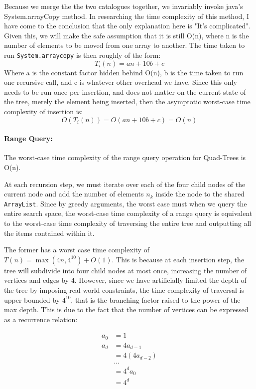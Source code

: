 \documentclass[12pt]{article}
\begin{document}
{Because we merge the the two catalogues together, we invariably invoke java's System.arrayCopy method. In researching the time complexity of this method, I have come to the conclusion that the only explanation here is "It's complicated". Given this, we will make the safe assumption that it is still O(n), where n is the number of elements to be moved from one array to another. \newline
The time taken to run \texttt{System.arraycopy} is then roughly of the form:
$$T_i(n) = an + 10b + c$$
Where a is the constant factor hidden behind O(n), b is the time taken to run one recursive call, and c is whatever other overhead we have. Since this only needs to be run once per insertion, and does not matter on the current state of the tree, merely the element being inserted, then the asymptotic worst-case time complexity of insertion is:
$$O(T_i(n)) = O(an + 10b + c) = O(n)$$



\paragraph{Range Query:} 
The worst-case time complexity of the range query operation for Quad-Trees is O(n).

At each recursion step, we must iterate over each of the four child nodes of the current node and add the number of elements $n_k$ inside the node to the shared \texttt{ArrayList}. Since by greedy arguments, the worst case must when we query the entire search space, the worst-case time complexity of a range query is equivalent to the worst-case time complexity of traversing the entire tree and outputting all the items contained within it. 

The former has a worst case time complexity of $T(n) = \max(4n, 4^{10}) + O(1)$. This is because at each insertion step, the tree will subdivide into four child nodes at most once, increasing the number of vertices and edges by 4. However, since we have artificially limited the depth of the tree by imposing real-world constraints, the time complexity of traversal is upper bounded by $4^{10}$, that is the branching factor raised to the power of the max depth. This is due to the fact that the number of vertices can be expressed as a recurrence relation:

\begin{align*}
a_0 & = 1 \\
a_d & = 4a_{d-1}\\
    & = 4(4a_{d-2}) \\
    & \ldots \\
    & = 4^da_0 \\
    & = 4^d \\
\end{align*}

}
\end{document}
